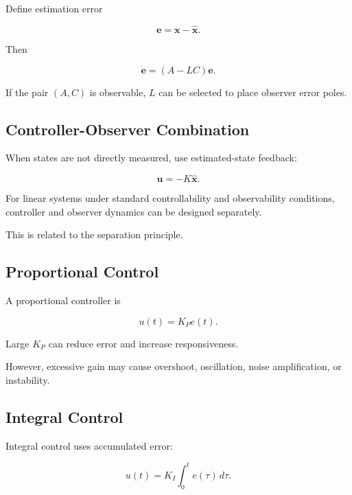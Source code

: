 Define estimation error

\[
\boxed{
\mathbf{e}
=
\mathbf{x}
-
\hat{\mathbf{x}}.
}
\]

Then

\[
\boxed{
\dot{\mathbf{e}}
=
(A-LC)\mathbf{e}.
}
\]

If the pair \((A,C)\) is observable, \(L\) can be selected to place observer
error poles.

\subsection{Controller-Observer Combination}
\label{subsec:controller-observer-combination}

When states are not directly measured, use estimated-state feedback:

\[
\boxed{
\mathbf{u}
=
-K\hat{\mathbf{x}}.
}
\]

For linear systems under standard controllability and observability
conditions, controller and observer dynamics can be designed separately.

This is related to the separation principle.

\subsection{Proportional Control}
\label{subsec:proportional-control}

A proportional controller is

\[
\boxed{
u(t)
=
K_Pe(t).
}
\]

Large \(K_P\) can reduce error and increase responsiveness.

However, excessive gain may cause overshoot, oscillation, noise
amplification, or instability.

\subsection{Integral Control}
\label{subsec:integral-control}

Integral control uses accumulated error:

\[
\boxed{
u(t)
=
K_I
\int_0^t
e(\tau)\,d\tau.
}
\]

